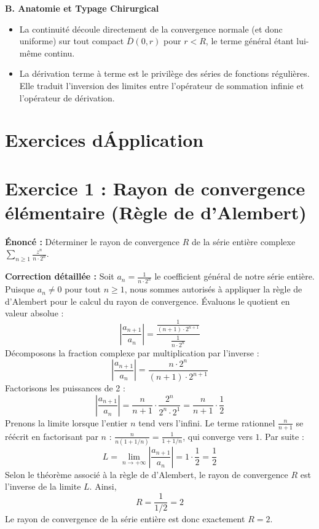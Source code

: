 \documentclass{report}
\begin{document}
\textbf{B. Anatomie et Typage Chirurgical}
\begin{itemize}
\item La continuité découle directement de la convergence normale (et donc uniforme) sur tout compact $\overline{D}(0, r)$ pour $r < R$, le terme général étant lui-même continu.
\item La dérivation terme à terme est le privilège des séries de fonctions régulières. Elle traduit l'inversion des limites entre l'opérateur de sommation infinie et l'opérateur de dérivation.
\end{itemize}

\newpage
\chapter*{Exercices d\'Application}
\chapter*{Exercice 1 : Rayon de convergence élémentaire (Règle de d'Alembert)}

\textbf{Énoncé :}
Déterminer le rayon de convergence $R$ de la série entière complexe $\sum_{n \geq 1} \frac{z^n}{n \cdot 2^n}$.

\textbf{Correction détaillée :}
Soit $a_n = \frac{1}{n \cdot 2^n}$ le coefficient général de notre série entière.
Puisque $a_n \neq 0$ pour tout $n \geq 1$, nous sommes autorisés à appliquer la règle de d'Alembert pour le calcul du rayon de convergence.
Évaluons le quotient en valeur absolue :
$$ \left| \frac{a_{n+1}}{a_n} \right| = \frac{\frac{1}{(n+1) \cdot 2^{n+1}}}{\frac{1}{n \cdot 2^n}} $$
Décomposons la fraction complexe par multiplication par l'inverse :
$$ \left| \frac{a_{n+1}}{a_n} \right| = \frac{n \cdot 2^n}{(n+1) \cdot 2^{n+1}} $$
Factorisons les puissances de 2 :
$$ \left| \frac{a_{n+1}}{a_n} \right| = \frac{n}{n+1} \cdot \frac{2^n}{2^n \cdot 2^1} = \frac{n}{n+1} \cdot \frac{1}{2} $$
Prenons la limite lorsque l'entier $n$ tend vers l'infini. Le terme rationnel $\frac{n}{n+1}$ se réécrit en factorisant par $n$ : $\frac{n}{n(1 + 1/n)} = \frac{1}{1 + 1/n}$, qui converge vers $1$.
Par suite :
$$ L = \lim_{n \to +\infty} \left| \frac{a_{n+1}}{a_n} \right| = 1 \cdot \frac{1}{2} = \frac{1}{2} $$
Selon le théorème associé à la règle de d'Alembert, le rayon de convergence $R$ est l'inverse de la limite $L$.
Ainsi,
$$ R = \frac{1}{1/2} = 2 $$
Le rayon de convergence de la série entière est donc exactement $R = 2$.
\end{document}
